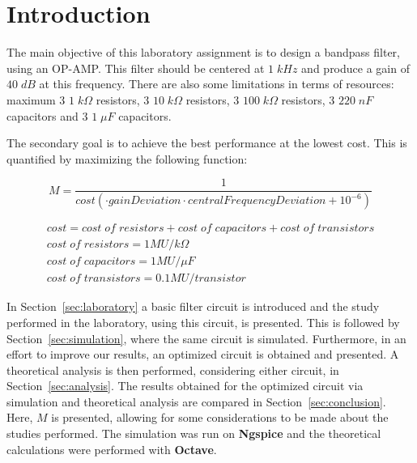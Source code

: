 \newpage

\section{Introduction}
\label{sec:introduction}

The main objective of this laboratory assignment is to design a bandpass filter, using an OP-AMP. This filter should be centered at $1\;kHz$ and produce a gain of $40\;dB$ at this frequency. There are also some limitations in terms of resources: maximum 3 $1\;k\Omega$ resistors, 3 $10\;k\Omega$ resistors, 3 $100\;k\Omega$ resistors, 3 $220\;nF$ capacitors and 3 $1\;\mu F$ capacitors. 

The secondary goal is to achieve the best performance at the lowest cost. This is quantified by maximizing the following function:

\begin{equation}
  M = \frac{1}{cost (\cdot gainDeviation \cdot centralFrequencyDeviation + 10^{-6})}
\end{equation}

\begin{gather*}
  cost = cost\;of\;resistors + cost\;of\;capacitors + cost\;of\;transistors \\
  cost\;of\;resistors = 1 MU/k\Omega \\
  cost\;of\;capacitors = 1 MU/\mu F \\
  cost\;of\;transistors = 0.1 MU/transistor
\end{gather*}

In Section~\ref{sec:laboratory} a basic filter circuit is introduced and the study performed in the laboratory, using this circuit, is presented. This is followed by Section~\ref{sec:simulation}, where the same circuit is simulated. Furthermore, in an effort to improve our results, an optimized circuit is obtained and presented. A theoretical analysis is then performed, considering either circuit, in Section~\ref{sec:analysis}. The results obtained for the optimized circuit via simulation and theoretical analysis are compared in Section~\ref{sec:conclusion}. Here, $M$ is presented, allowing for some considerations to be made about the studies performed. The simulation was run on {\bf Ngspice} and the theoretical calculations were performed with {\bf Octave}.


